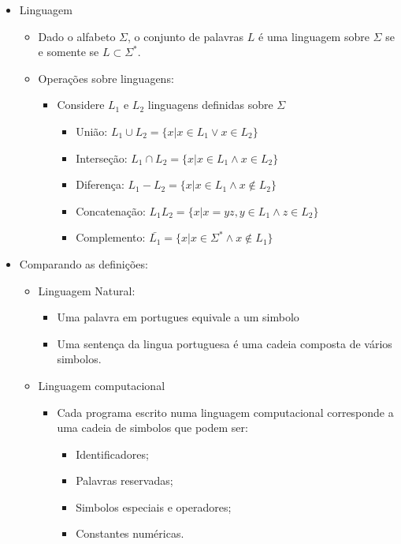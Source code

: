 \documentclass[12pt]{article}
\begin{document}
\begin{itemize}
\begin{itemize}
        tal que $y=wx$
        \item $x$ é uma subpalavra de $y$, se e somente se, $\exists w,u\in
        \Sigma^*$ tal que $y=wxu$
    \end{itemize}
    \item Linguagem
    \begin{itemize}
        \item Dado o alfabeto $\Sigma$, o conjunto de palavras $L$ é uma 
        linguagem sobre $\Sigma$ se e somente se $L \subset \Sigma^*$.
        \item Operações sobre linguagens:
        \begin{itemize}
            \item Considere \(L_1\) e \(L_2\) linguagens definidas sobre 
            \(\Sigma\)
            \begin{itemize}
                \item União: \(L_1 \cup L_2 = \{x|x\in L_1 \vee x \in L_2\}\)
                \item Interseção: \(L_1 \cap L_2 = \{x|x\in L_1 \wedge x \in 
                L_2\}\)
                \item Diferença: \(L_1 - L_2 = \{x|x\in L_1 \wedge x \notin 
                L_2\}\)
                \item Concatenação: \(L_1L_2 = \{x|x=yz, y \in L_1 \wedge z \in 
                L_2\}\)
                \item Complemento: \(\bar{L_1} = \{x|x\in \Sigma^* \wedge x 
                \notin L_1\}\)
            \end{itemize}
        \end{itemize}
    \end{itemize}
    \item Comparando as definições:
    \begin{itemize}
        \item Linguagem Natural:
        \begin{itemize}
            \item Uma palavra em portugues equivale a um simbolo
            \item Uma sentença da lingua portuguesa é uma cadeia composta de 
            vários simbolos.
        \end{itemize}
        \item Linguagem computacional
        \begin{itemize}
            \item Cada programa escrito numa linguagem computacional corresponde 
            a uma cadeia de simbolos que podem ser:
            \begin{itemize}
                \item Identificadores;
                \item Palavras reservadas;
                \item Simbolos especiais e operadores;
                \item Constantes numéricas.
            \end{itemize}
        \end{itemize}
    \end{itemize}
\end{itemize}
\end{document}
